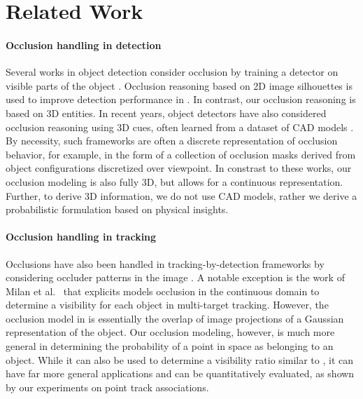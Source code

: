 \section{Related Work}
\label{sec:related}

\paragraph{Occlusion handling in detection}
Several works in object detection consider occlusion by training a detector on visible parts of the object \cite{Gao_etal_2011}. Occlusion reasoning based on 2D image silhouettes is used to improve detection performance in \cite{Hsiao_Herbert_2012}. In contrast, our occlusion reasoning is based on 3D entities. In recent years, object detectors have also considered occlusion reasoning using 3D cues, often learned from a dataset of CAD models \cite{Pepik_etal_2012,Pepik_etal_2013,Xiang_Savarese_2013}. By necessity, such frameworks are often a discrete representation of occlusion behavior, for example, in the form of a collection of occlusion masks derived from object configurations discretized over viewpoint. In constrast to these works, our occlusion modeling is also fully 3D, but allows for a continuous representation. Further, to derive 3D information, we do not use CAD models, rather we derive a probabilistic formulation based on physical insights.

\paragraph{Occlusion handling in tracking}
Occlusions have also been handled in tracking-by-detection frameworks by considering occluder patterns in the image \cite{Kwak_etal_2012,Wu_Nevatia_2007}. A notable exception is the work of Milan et al.~\cite{Milan_etal_2014} that explicits models occlusion in the continuous domain to determine a visibility for each object in multi-target tracking. However, the occlusion model in \cite{Milan_etal_2014} is essentially the overlap of image projections of a Gaussian representation of the object. Our occlusion modeling, however, is much more general in determining the probability of a point in space as belonging to an object. While it can also be used to determine a visibility ratio similar to \cite{Milan_etal_2014}, it can have far more general applications and can be quantitatively evaluated, as shown by our experiments on point track associations.

